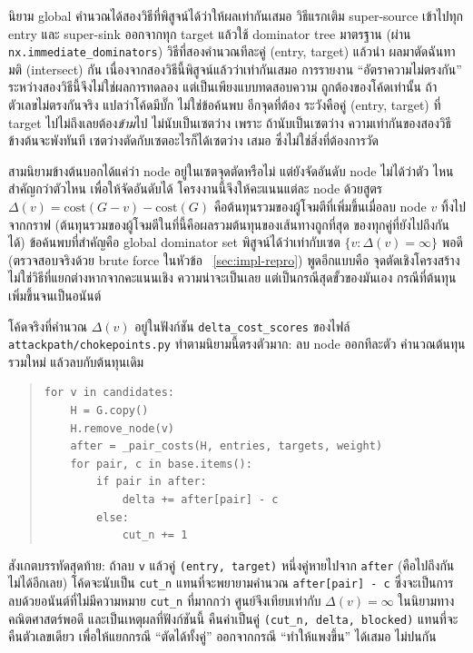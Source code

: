 นิยาม global คำนวณได้สองวิธีที่พิสูจน์ได้ว่าให้ผลเท่ากันเสมอ วิธีแรกเติม super-source
เข้าไปทุก entry และ super-sink ออกจากทุก target แล้วใช้ dominator tree มาตรฐาน
(ผ่าน \texttt{nx.immediate\_dominators}) วิธีที่สองคำนวณทีละคู่ (entry, target) แล้วนำ
ผลมาตัดฉันทามติ (intersect) กัน เนื่องจากสองวิธีนี้พิสูจน์แล้วว่าเท่ากันเสมอ การรายงาน
``อัตราความไม่ตรงกัน'' ระหว่างสองวิธีนี้จึงไม่ใช่ผลการทดลอง แต่เป็นเพียงแบบทดสอบความ
ถูกต้องของโค้ดเท่านั้น ถ้าตัวเลขไม่ตรงกันจริง แปลว่าโค้ดมีบั๊ก ไม่ใช่ข้อค้นพบ อีกจุดที่ต้อง
ระวังคือคู่ (entry, target) ที่ target ไปไม่ถึงเลยต้อง\emph{ข้าม}ไป ไม่นับเป็นเซตว่าง เพราะ
ถ้านับเป็นเซตว่าง ความเท่ากันของสองวิธีข้างต้นจะพังทันที เซตว่างตัดกับเซตอะไรก็ได้เซตว่าง
เสมอ ซึ่งไม่ใช่สิ่งที่ต้องการวัด

สามนิยามข้างต้นบอกได้แค่ว่า node อยู่ในเซตจุดตัดหรือไม่ แต่ยังจัดอันดับ node ไม่ได้ว่าตัว
ไหนสำคัญกว่าตัวไหน เพื่อให้จัดอันดับได้ โครงงานนี้จึงให้คะแนนแต่ละ node ด้วยสูตร
$\Delta(v) = \text{cost}(G{-}v) - \text{cost}(G)$ คือต้นทุนรวมของผู้โจมตีที่เพิ่มขึ้นเมื่อลบ
node $v$ ทิ้งไปจากกราฟ (ต้นทุนรวมของผู้โจมตีในที่นี้คือผลรวมต้นทุนของเส้นทางถูกที่สุด
ของทุกคู่ที่ยังไปถึงกันได้) ข้อค้นพบที่สำคัญคือ global dominator set พิสูจน์ได้ว่าเท่ากับเซต
$\{v : \Delta(v) = \infty\}$ พอดี (ตรวจสอบจริงด้วย brute force ในหัวข้อ~
\ref{sec:impl-repro}) พูดอีกแบบคือ จุดตัดเชิงโครงสร้างไม่ใช่วิธีที่แยกต่างหากจากคะแนนเชิง
ความน่าจะเป็นเลย แต่เป็นกรณีสุดขั้วของมันเอง กรณีที่ต้นทุนเพิ่มขึ้นจนเป็นอนันต์

โค้ดจริงที่คำนวณ $\Delta(v)$ อยู่ในฟังก์ชัน \texttt{delta\_cost\_scores} ของไฟล์
\texttt{attackpath/chokepoints.py} ทำตามนิยามนี้ตรงตัวมาก: ลบ node ออกทีละตัว
คำนวณต้นทุนรวมใหม่ แล้วลบกับต้นทุนเดิม

\begin{quote}\small\begin{verbatim}
for v in candidates:
    H = G.copy()
    H.remove_node(v)
    after = _pair_costs(H, entries, targets, weight)
    for pair, c in base.items():
        if pair in after:
            delta += after[pair] - c
        else:
            cut_n += 1
\end{verbatim}\end{quote}

สังเกตบรรทัดสุดท้าย: ถ้าลบ \texttt{v} แล้วคู่ \texttt{(entry, target)} หนึ่งคู่หายไปจาก
\texttt{after} (คือไปถึงกันไม่ได้อีกเลย) โค้ดจะนับเป็น \texttt{cut\_n} แทนที่จะพยายามคำนวณ
\texttt{after[pair] - c} ซึ่งจะเป็นการลบด้วยอนันต์ที่ไม่มีความหมาย \texttt{cut\_n} ที่มากกว่า
ศูนย์จึงเทียบเท่ากับ $\Delta(v)=\infty$ ในนิยามทางคณิตศาสตร์พอดี และเป็นเหตุผลที่ฟังก์ชันนี้
คืนค่าเป็นคู่ \texttt{(cut\_n, delta, blocked)} แทนที่จะคืนตัวเลขเดียว เพื่อให้แยกกรณี
``ตัดได้ทั้งคู่'' ออกจากกรณี ``ทำให้แพงขึ้น'' ได้เสมอ ไม่ปนกัน

